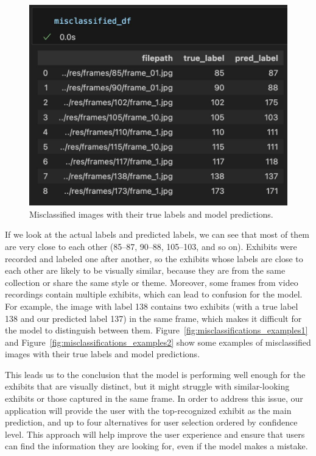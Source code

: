 \begin{figure}[h]
    \centering
    \includegraphics[width=1.0\textwidth]{img/misclassifications.png}
    \caption{Misclassified images with their true labels and model predictions.}\label{fig:misclassifications}
\end{figure}

If we look at the actual labels and predicted labels, we can see that most of them are very close to each other (85--87, 90--88, 105--103, and so on). Exhibits were recorded and labeled one after another, so the exhibits whose labels are close to each other are likely to be visually similar, because they are from the same collection or share the same style or theme. Moreover, some frames from video recordings contain multiple exhibits, which can lead to confusion for the model. For example, the image with label 138 contains two exhibits (with a true label 138 and our predicted label 137) in the same frame, which makes it difficult for the model to distinguish between them. Figure~\ref{fig:misclassifications_examples1} and Figure~\ref{fig:misclassifications_examples2} show some examples of misclassified images with their true labels and model predictions.

This leads us to the conclusion that the model is performing well enough for the exhibits that are visually distinct, but it might struggle with similar-looking exhibits or those captured in the same frame. In order to address this issue, our application will provide the user with the top-recognized exhibit as the main prediction, and up to four alternatives for user selection ordered by confidence level. This approach will help improve the user experience and ensure that users can find the information they are looking for, even if the model makes a mistake.

